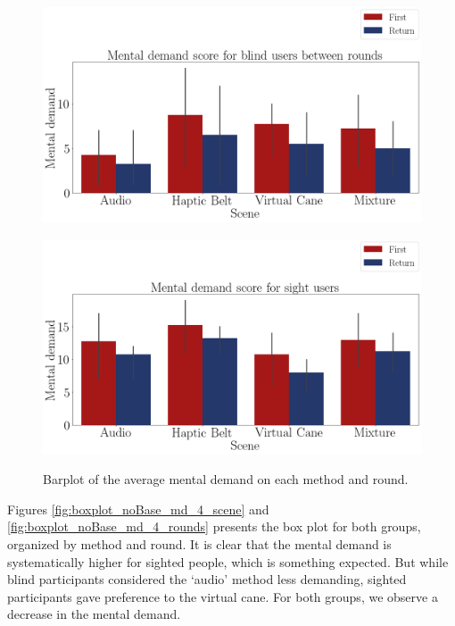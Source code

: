 \begin{figure}[!htb]
    \centering
    \begin{minipage}{\textwidth}
        \centering
        \includegraphics[width = 0.8\linewidth]{Resultados/Nasa/Figuras/png/barplot_md_avg_4_scene_blind.png}
        \label{fig:barplot_md_avg_4_scene_blind}
    \end{minipage}
    \begin{minipage}{\textwidth}
        \centering
        \includegraphics[width = 0.8\linewidth]{Resultados/Nasa/Figuras/png/barplot_md_avg_4_scene_sight.png}
        \label{fig:barplot_md_avg_4_scene_sight}
    \end{minipage}
    \caption{Barplot of the average mental demand on each method and round.}
    \label{fig:barplot_md_avg_4_scene_blind_sight}
\end{figure}

Figures \ref{fig:boxplot_noBase_md_4_scene} and \ref{fig:boxplot_noBase_md_4_rounds} presents the box plot for both groups, organized by method and round. It is clear that the mental demand is systematically higher for sighted people, which is something expected. But while blind participants considered the ‘audio’ method less demanding, sighted participants gave preference to the virtual cane. For both groups, we observe a decrease in the mental demand.

